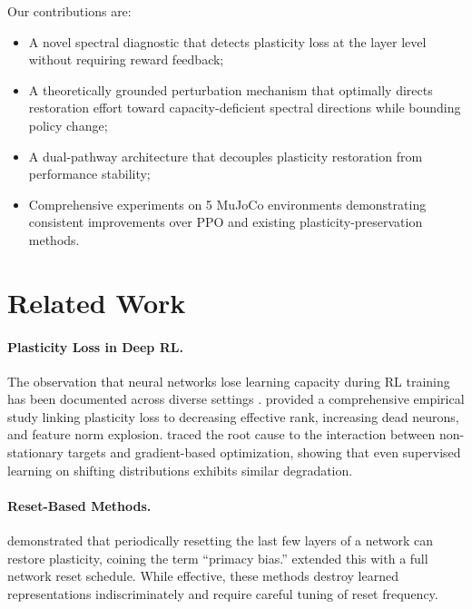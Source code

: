 \documentclass{article}
\begin{document}
Our contributions are:
\begin{itemize}
    \item A novel spectral diagnostic that detects plasticity loss at the layer level without requiring reward feedback;
    \item A theoretically grounded perturbation mechanism that optimally directs restoration effort toward capacity-deficient spectral directions while bounding policy change;
    \item A dual-pathway architecture that decouples plasticity restoration from performance stability;
    \item Comprehensive experiments on 5 MuJoCo environments demonstrating consistent improvements over PPO and existing plasticity-preservation methods.
\end{itemize}


\section{Related Work}
\label{sec:related}

\paragraph{Plasticity Loss in Deep RL.}
The observation that neural networks lose learning capacity during RL training has been documented across diverse settings \citep{lyle2023understanding,dohare2024loss,nikishin2022primacy,kumar2020implicit}. \citet{lyle2023understanding} provided a comprehensive empirical study linking plasticity loss to decreasing effective rank, increasing dead neurons, and feature norm explosion. \citet{dohare2024loss} traced the root cause to the interaction between non-stationary targets and gradient-based optimization, showing that even supervised learning on shifting distributions exhibits similar degradation.

\paragraph{Reset-Based Methods.}
\citet{nikishin2022primacy} demonstrated that periodically resetting the last few layers of a network can restore plasticity, coining the term ``primacy bias.'' \citet{d2022sample} extended this with a full network reset schedule. While effective, these methods destroy learned representations indiscriminately and require careful tuning of reset frequency.
\end{document}
